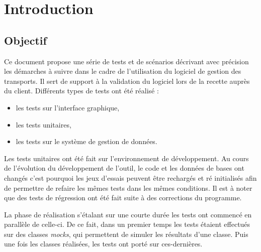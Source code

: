 \documentclass[11pt,fleqn]{report}
\begin{document}
    
\ZMakeCover


\ZMakeTableOfContents

\chapter{Introduction}
\section{Objectif}
Ce document propose une série de tests et de scénarios décrivant avec précision les démarches à suivre dans le cadre de l’utilisation du logiciel de gestion des transports. Il sert de support à la validation du logiciel lors de la recette auprès du client.
Différents types de tests ont été réalisé : 
\begin{itemize}
\item les tests sur l'interface graphique,
\item les tests unitaires,
\item les tests sur le système de gestion de données.
\end{itemize}
Les tests unitaires ont été fait sur l’environnement de développement. 
Au cours de l’évolution du développement de l'outil, le code et les données de bases ont changés c'est pourquoi les jeux d’essais peuvent être rechargés  et ré initialisés afin de permettre de refaire les mêmes tests dans les mêmes conditions. 
Il est à noter que des tests de régression ont été fait suite à des corrections du programme.

La phase de réalisation s'étalant sur une courte durée les tests ont commencé en parallèle de celle-ci. De ce fait, dans un premier temps les tests étaient effectués sur des classes \emph{mocks}, qui permettent de simuler les résultats d'une classe. Puis une fois les classes réalisées, les tests ont porté sur ces-dernières.
\end{document}
